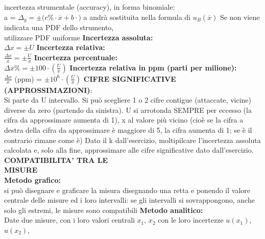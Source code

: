 \documentclass{article}
\begin{document}
\begin{multicols*}{3}
    incertezza strumentale (accuracy), in forma binomiale: \\
    a = $\Delta_g = \pm (c \%  \cdot \overline{x} + b \cdot $$)$ \newline 
    a andrà sostituita nella formula di $u_B (\overline{x})$ \newline 
    Se non viene indicata una PDF dello strumento, \\
    utilizzare PDF uniforme \newline 
    \textbf{Incertezza assoluta:}\\
    $\Delta x = \pm U$ \newline
    \textbf{Incertezza relativa:}\\
    $\frac{\Delta x}{x} = \pm \frac{U}{x}$ \newline 
    \textbf{Incertezza percentuale:}\\ 
    $\Delta x \% = \pm 100 \cdot (\frac{U}{x})$ \newline 
    \textbf{Incertezza relativa in ppm (parti per milione):}\\ 
    $\frac{\Delta x}{x}$ (ppm) = $\pm 10^{6} \cdot (\frac{U}{x})$ \newline 
    \textbf{CIFRE SIGNIFICATIVE \\ (APPROSSIMAZIONI)}: \\
    Si parte da U intervallo. 
    Si può scegliere 1 o 2 cifre contigue (attaccate, vicine) diverse da zero (partendo da sinistra). 
    U si arrotonda SEMPRE per eccesso (la cifra da approssimare aumenta di 1), 
    x al valore più vicino (cioè se la cifra a destra della cifra da approssimare è maggiore di 5, la cifra aumenta di 1; se è il contrario rimane come è) \newline 
    Dato il k dall'esercizio, moltipilcare l'incertezza assoluta calcolata e, solo alla fine, approssimare alle cifre significative dato dall'esercizio. \newline
    \textbf{COMPATIBILITA' TRA LE \\ MISURE} \\
    \textbf{Metodo grafico:} \\
    si può disegnare e graficare la misura disegnando una retta e ponendo il valore centrale delle misure ed i loro intervalli: 
    se gli intervalli si sovrappongono, anche solo gli estremi, le misure sono compatibili \newline 
    \textbf{Metodo analitico:} \\
    Date due misure, con i loro valori centrali $x_1$, $x_2$ con le loro incertezze $u(x_1)$, $u(x_2)$, 

\end{multicols*}
\end{document}
